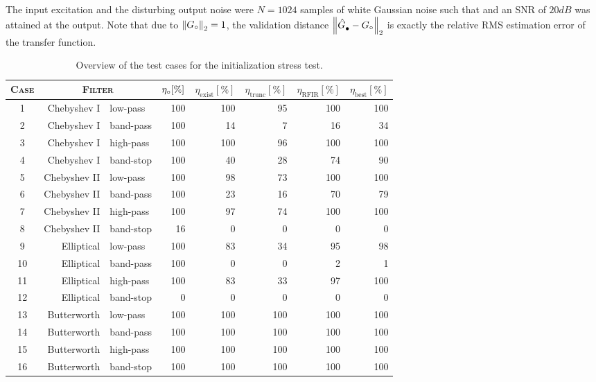 The input excitation and the disturbing output noise were $N=1024$ samples of white Gaussian noise such that and an \gls{SNR} of $20 \unit{dB}$ was attained at the output.
Note that due to $\norm[2]{\true{G}}=1$, the validation distance $\norm[2]{\model{\bullet} - \true{G}}$ is exactly the relative \gls{RMS} estimation error of the transfer function.

\begin{table}
  \centering
  \caption{Overview of the test cases for the initialization stress test.}
\begin{tabular}{crlrrrrr}
\toprule
\textsc{Case}   &  \multicolumn{2}{c}{\textsc{Filter}}   &  $\true{\eta} [\%]$  &  $\eta_{\mathrm{exist}} [\%]$ &  $\eta_{\mathrm{trunc}} [\%]$   &  $\eta_{\mathrm{RFIR}} [\%]$  &  $\eta_{\mathrm{best}} [\%]$ \\
\midrule
1  &  {Chebyshev I}  &  low-pass   & 100 & 100 & 95  & 100 & 100\\
2  &  {Chebyshev I}  &  band-pass   & 100 & 14  & 7 & 16  & 34\\
3  &  {Chebyshev I}  &  high-pass     & 100 & 100 & 96  & 100 & 100\\
4  &  {Chebyshev I}  &  band-stop     & 100 & 40  & 28  & 74  & 90\\
5  &  {Chebyshev II}   &  low-pass     & 100 & 98  & 73  & 100 & 100\\
6  &  {Chebyshev II}   &  band-pass     & 100 & 23  & 16  & 70  & 79\\
7  &  {Chebyshev II}   &  high-pass     & 100 & 97  & 74  & 100 & 100\\
8  &  {Chebyshev II}   &  band-stop     & 16  & 0 & 0 & 0 & 0\\
9  &  Elliptical   &  low-pass     & 100 & 83  & 34  & 95  & 98\\
10   &  Elliptical   &  band-pass     & 100 & 0 & 0 & 2 & 1\\
11   &  Elliptical   &  high-pass     & 100 & 83  & 33  & 97  & 100\\
12   &  Elliptical   &  band-stop     & 0 & 0 & 0 & 0 & 0\\
13   &  Butterworth  &  low-pass     & 100 & 100 & 100 & 100 & 100\\
14   &  Butterworth  &  band-pass     & 100 & 100 & 100 & 100 & 100\\
15   &  Butterworth  &  high-pass     & 100 & 100 & 100 & 100 & 100\\
16   &  Butterworth  &  band-stop     & 100 & 100 & 100 & 100 & 100\\
\bottomrule
\end{tabular}
\label{tbl:init:stresstest}
\end{table}

